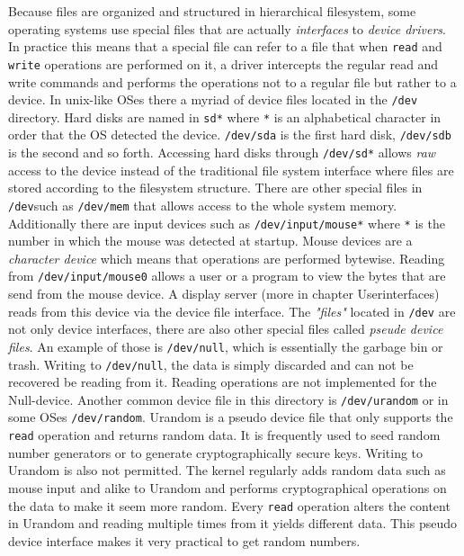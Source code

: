 Because files are organized and structured in hierarchical filesystem, some operating systems use special
files that are actually \textit{interfaces} to \textit{device drivers}. In practice this means that a special file can
refer to a file that when \texttt{read} and \texttt{write} operations are performed on it, a driver intercepts the regular
read and write commands and performs the operations not to a regular file but rather to a device. In unix-like
OSes there a myriad of device files located in the \texttt{/dev} directory. Hard disks are named in \texttt{sd*} where \texttt{*}
is an alphabetical character in order that the OS detected the device. \texttt{/dev/sda} is the first hard disk,
\texttt{/dev/sdb} is the second and so forth. Accessing hard disks through \texttt{/dev/sd*} allows \textit{raw} access to the
device instead of the traditional file system interface where files are stored according to the filesystem
structure. There are other special files in \texttt{/dev}such as \texttt{/dev/mem} that allows access to the whole system
memory. Additionally there are input devices such as \texttt{/dev/input/mouse*} where \texttt{*} is the number in which the
mouse was detected at startup. Mouse devices are a \textit{character device} which means that operations are performed
bytewise. Reading from \texttt{/dev/input/mouse0} allows a user or a program to view the bytes that are send from the
mouse device. A display server (more in chapter Userinterfaces) reads from this device via the device file
interface. The \textit{"files"} located in \texttt{/dev} are not only device interfaces, there are also other special files called \textit{pseude device files}.
An example of those is \texttt{/dev/null}, which is essentially the garbage bin or trash. Writing to \texttt{/dev/null},
the data is simply discarded and can not be recovered be reading from it. Reading operations are not implemented for
the Null-device. Another common device file in this directory is \texttt{/dev/urandom} or in some OSes \texttt{/dev/random}. Urandom is a pseudo device file
that only supports the \texttt{read} operation and returns random data. It is frequently used to seed random number
generators or to generate cryptographically secure keys. Writing to Urandom is also not permitted. The kernel regularly
adds random data such as mouse input and alike to Urandom and performs cryptographical operations on the data to make
it seem more random. Every \texttt{read} operation alters the content in Urandom and reading multiple times from it yields
different data. This pseudo device interface makes it very practical to get random numbers.
